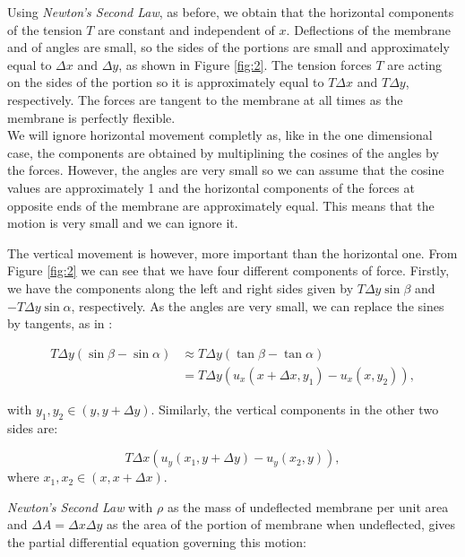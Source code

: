 \documentclass[a4paper, 12pt]{article}
\numberwithin{equation}{section}
\begin{document}
Using \emph{Newton's Second Law}, as before, we obtain that the horizontal components of the tension $T$ are constant and independent of $x$.
Deflections of the membrane and of angles are small, so the sides of the portions are small and approximately equal to $\Delta x$ and $\Delta y$, 
as shown in Figure \ref{fig:2}. The tension forces $T$ are acting on the sides of the portion so it is approximately equal to $T\Delta x$ and $T\Delta y$, 
respectively. The forces are tangent to the membrane at all times as the membrane is perfectly flexible.
\\

We will ignore horizontal movement completly as, like in the one dimensional case, the components are obtained by multiplining the cosines of 
the angles by the forces. However, the angles are very small so we can assume that the cosine values are approximately 1 and the horizontal 
components of the forces at opposite ends of the membrane are approximately equal. This means that the motion is very small and we can ignore it.

The vertical movement is however, more important than the horizontal one. From Figure \ref{fig:2} we can see that we have four different components of force.
Firstly, we have the components along the left and right sides given by $T\Delta y \sin\beta$ and $-T\Delta y\sin\alpha$, respectively. As the 
angles are very small, we can replace the sines by tangents, as in \cite{Kr}:

\begin{equation} \label{eq9}
\begin{split} 
    T\Delta y(\sin\beta - \sin\alpha) & \approx T\Delta y(\tan\beta-\tan\alpha)\\
    &= T\Delta y(u_x(x+\Delta x, y_1)-u_x(x, y_2)), 
\end{split}
\end{equation}

with $y_1, y_2 \in(y, y+\Delta y)$. Similarly, the vertical components in the other two sides are:

\begin {equation} \label{eq10}
    T\Delta x(u_y(x_1, y+\Delta y)-u_y(x_2,y)),
\end{equation}
where $x_1, x_2 \in(x, x+\Delta x)$.

\emph{Newton's Second Law} with $\rho$ as the mass of undeflected membrane per unit area and $\Delta A=\Delta x\Delta y$ as the area of the portion
of membrane when undeflected, gives the partial differential equation governing this motion:
\end{document}
